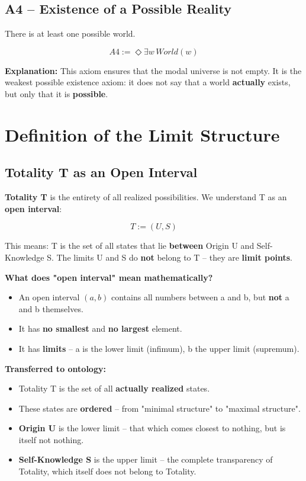 \documentclass[
]{article}
\begin{document}
\subsection{A4 – Existence of a Possible Reality}\label{a4-existence-of-a-possible-reality}

There is at least one possible world.

\[
\boxed{A4 := \Diamond\exists w\, World(w)}
\]

\textbf{Explanation:} This axiom ensures that the modal universe is not empty. It is the weakest possible existence axiom: it does not say that a world \textbf{actually} exists, but only that it is \textbf{possible}.

\section{Definition of the Limit Structure}\label{definition-of-the-limit-structure}

\subsection{Totality T as an Open Interval}\label{totality-t-as-an-open-interval}

\textbf{Totality T} is the entirety of all realized possibilities. We understand T as an \textbf{open interval}:

\[
\boxed{T := (U, S)}
\]

This means: T is the set of all states that lie \textbf{between} Origin U and Self-Knowledge S. The limits U and S do \textbf{not} belong to T – they are \textbf{limit points}.

\textbf{What does "open interval" mean mathematically?}
\begin{itemize}
\item An open interval \((a, b)\) contains all numbers between a and b, but \textbf{not} a and b themselves.
\item It has \textbf{no smallest} and \textbf{no largest} element.
\item It has \textbf{limits} – a is the lower limit (infimum), b the upper limit (supremum).
\end{itemize}

\textbf{Transferred to ontology:}
\begin{itemize}
\item Totality T is the set of all \textbf{actually realized} states.
\item These states are \textbf{ordered} – from "minimal structure" to "maximal structure".
\item \textbf{Origin U} is the lower limit – that which comes closest to nothing, but is itself not nothing.
\item \textbf{Self-Knowledge S} is the upper limit – the complete transparency of Totality, which itself does not belong to Totality.
\end{itemize}
\end{document}
